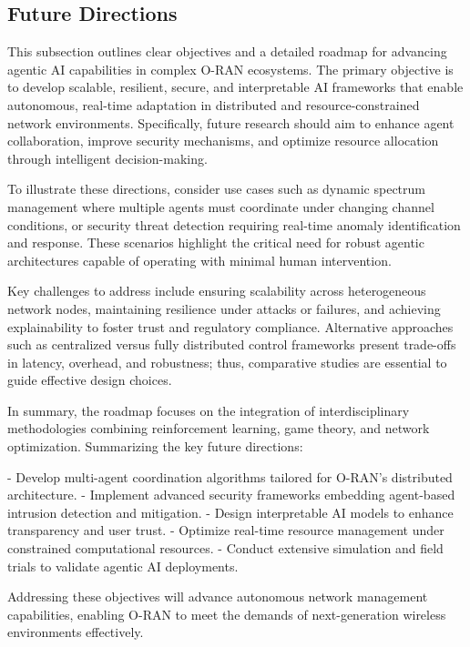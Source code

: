 \documentclass[sigconf]{acmart}
\begin{document}
\subsection{Future Directions}

This subsection outlines clear objectives and a detailed roadmap for advancing agentic AI capabilities in complex O-RAN ecosystems. The primary objective is to develop scalable, resilient, secure, and interpretable AI frameworks that enable autonomous, real-time adaptation in distributed and resource-constrained network environments. Specifically, future research should aim to enhance agent collaboration, improve security mechanisms, and optimize resource allocation through intelligent decision-making.

To illustrate these directions, consider use cases such as dynamic spectrum management where multiple agents must coordinate under changing channel conditions, or security threat detection requiring real-time anomaly identification and response. These scenarios highlight the critical need for robust agentic architectures capable of operating with minimal human intervention.

Key challenges to address include ensuring scalability across heterogeneous network nodes, maintaining resilience under attacks or failures, and achieving explainability to foster trust and regulatory compliance. Alternative approaches such as centralized versus fully distributed control frameworks present trade-offs in latency, overhead, and robustness; thus, comparative studies are essential to guide effective design choices.

In summary, the roadmap focuses on the integration of interdisciplinary methodologies combining reinforcement learning, game theory, and network optimization. Summarizing the key future directions:

- Develop multi-agent coordination algorithms tailored for O-RAN’s distributed architecture.
- Implement advanced security frameworks embedding agent-based intrusion detection and mitigation.
- Design interpretable AI models to enhance transparency and user trust.
- Optimize real-time resource management under constrained computational resources.
- Conduct extensive simulation and field trials to validate agentic AI deployments.

Addressing these objectives will advance autonomous network management capabilities, enabling O-RAN to meet the demands of next-generation wireless environments effectively.
\end{document}
